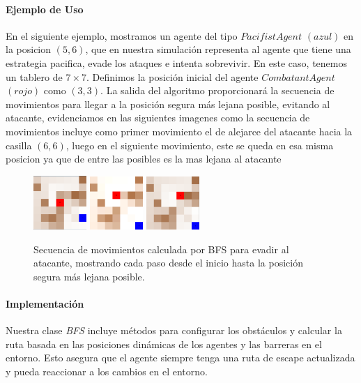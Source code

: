 \documentclass[11pt]{article}
\begin{document}
\paragraph{Ejemplo de Uso}
En el siguiente ejemplo, mostramos un agente del tipo $PacifistAgent$ \( (azul) \) en la posicion \( (5, 6) \), que en nuestra simulación representa al agente que tiene una estrategia pacifica, evade los ataques e intenta sobrevivir.
En este caso, tenemos un tablero de \(7 \times 7\). Definimos la posición inicial del agente $CombatantAgent$ \( (rojo) \) como \( (3, 3) \). La salida del algoritmo proporcionará la secuencia de movimientos para llegar a la posición segura más lejana posible, evitando al atacante, evidenciamos en las siguientes imagenes como
la secuencia de movimientos incluye como primer movimiento el de alejarce del atacante hacia la casilla \( (6, 6) \), luego en el siguiente movimiento, este se queda en esa misma posicion ya que de entre las posibles es la mas lejana al atacante


\begin{figure}[H]
    \centering
    \includegraphics[width=0.18\textwidth]{images/image6.png}\hfill
    \includegraphics[width=0.18\textwidth]{images/image7.png}\hfill
    \includegraphics[width=0.18\textwidth]{images/image8.png}
    \caption{Secuencia de movimientos calculada por BFS para evadir al atacante, mostrando cada paso desde el inicio hasta la posición segura más lejana posible.}
\end{figure}

\paragraph{Implementación}
Nuestra clase \textit{BFS} incluye métodos para configurar los obstáculos y calcular la ruta basada en las posiciones dinámicas de los agentes y las barreras en el entorno. Esto asegura que el agente siempre tenga una ruta de escape actualizada y pueda reaccionar a los cambios en el entorno.
\end{document}
